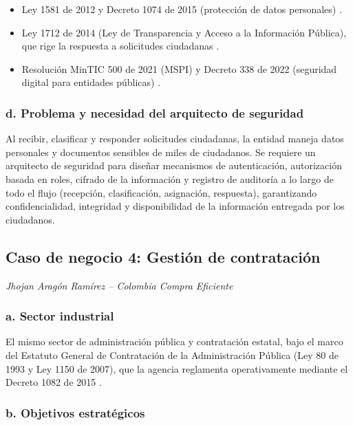 \begin{itemize}
	\item Ley 1581 de 2012 y Decreto 1074 de 2015 (protección de datos personales) \parencite{ley1581de2012,decreto1074de2015}.
	\item Ley 1712 de 2014 (Ley de Transparencia y Acceso a la Información Pública), que rige la respuesta a solicitudes ciudadanas \parencite{ley1712de2014}.
	\item Resolución MinTIC 500 de 2021 (MSPI) y Decreto 338 de 2022 (seguridad digital para entidades públicas) \parencite{mintic2021,decreto338de2022}.
\end{itemize}

\subsubsection*{d. Problema y necesidad del arquitecto de seguridad}

Al recibir, clasificar y responder solicitudes ciudadanas, la entidad maneja datos personales y documentos sensibles de miles de ciudadanos. Se requiere un arquitecto de seguridad para diseñar mecanismos de autenticación, autorización basada en roles, cifrado de la información y registro de auditoría a lo largo de todo el flujo (recepción, clasificación, asignación, respuesta), garantizando confidencialidad, integridad y disponibilidad de la información entregada por los ciudadanos.

\subsection{Caso de negocio 4: Gestión de contratación}

\textit{Jhojan Aragón Ramírez -- Colombia Compra Eficiente}

\subsubsection*{a. Sector industrial}

El mismo sector de administración pública y contratación estatal, bajo el marco del Estatuto General de Contratación de la Administración Pública (Ley 80 de 1993 y Ley 1150 de 2007), que la agencia reglamenta operativamente mediante el Decreto 1082 de 2015 \parencite{ley80de1993,ley1150de2007,decreto1082de2015}.

\subsubsection*{b. Objetivos estratégicos}


